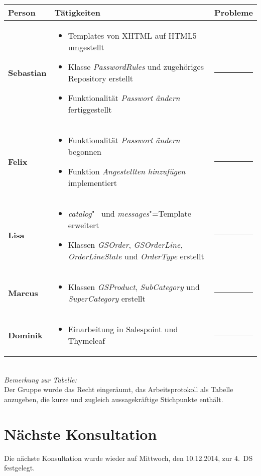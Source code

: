 \documentclass{scrartcl}
\begin{document}
\begin{tabularx}{\textwidth}{p{}Xl}
\hline
\textsf{\textbf{\large Person}} & \textsf{\textbf{\large Tätigkeiten}} & \textsf{\textbf{\large Probleme}} \\
\hline\hline
\textbf{Sebastian} & 
 \begin{itemize}
 \item Templates von XHTML auf HTML5 umgestellt
 \item Klasse \textit{PasswordRules} und zugehöriges Reposi\-tory erstellt
 \item Funktionalität \textit{Passwort ändern} fertiggestellt
 \end{itemize}
 & \rule[1ex]{.7cm}{1pt} \\ \hline
\textbf{Felix} & 
 \begin{itemize}
 \item Funktionalität \textit{Passwort ändern} begonnen
 \item Funktion \textit{Angestellten hinzufügen} implementiert
 \end{itemize}
 & \rule[1ex]{.7cm}{1pt} \\ \hline
\textbf{Lisa} & 
 \begin{itemize}
 \item \textit{catalog}"~ und \textit{messages}"=Template erweitert
 \item Klassen \textit{GSOrder}, \textit{GSOrderLine}, \textit{OrderLineState} und \textit{OrderType} erstellt
 \end{itemize}
& \rule[1ex]{.7cm}{1pt} \\ \hline
\textbf{Marcus} & 
 \begin{itemize}
 \item Klassen \textit{GSProduct}, \textit{SubCategory} und \textit{SuperCategory} erstellt
 \end{itemize}
& \rule[1ex]{.7cm}{1pt} \\ \hline
\textbf{Dominik} &
 \begin{itemize}
 \item Einarbeitung in Salespoint und Thymeleaf
 \end{itemize}
& \rule[1ex]{.7cm}{1pt} \\ \hline
\end{tabularx}\\[.4cm]
\textit{Bemerkung zur Tabelle:}\\
Der Gruppe wurde das Recht eingeräumt, das Arbeitsprotokoll als Tabelle anzugeben, die kurze und zugleich aussagekräftige Stichpunkte enthält. 

\vspace*{1em}

\section{Nächste Konsultation}
Die nächste Konsultation wurde wieder auf Mittwoch, den 10.12.2014, zur 4.~DS festgelegt.
\end{document}
